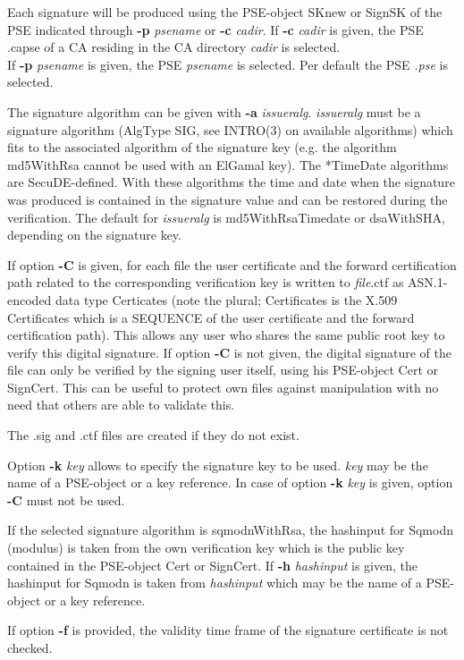 Each signature will be produced using the PSE-object SKnew or SignSK
of the PSE indicated through {\bf -p} {\em psename} or {\bf -c} {\em cadir}.
If {\bf -c} {\em cadir} is given, the PSE .capse of a CA residing in the CA directory {\em cadir}
is selected. \\
If {\bf -p} {\em psename} is given, the PSE {\em psename} is selected. Per default the PSE {\em .pse} is 
selected.

The signature algorithm can be given with {\bf -a} {\em issueralg}. 
{\em issueralg} must be a
signature algorithm (AlgType SIG, see INTRO(3) on available algorithms) which fits to the associated 
algorithm
of the signature key (e.g. the algorithm md5WithRsa cannot be used with an ElGamal key). The *TimeDate 
algorithms
are SecuDE-defined. With these algorithms the time and date when the signature was produced is 
contained
in the signature value and can be restored during the verification.
The default for {\em issueralg} is md5WithRsaTimedate or dsaWithSHA, depending on the signature key. 

If option {\bf -C} is given, for each file the user certificate and the forward certification path related to
the corresponding verification key is written to {\em file}.ctf as ASN.1-encoded data type Certicates 
(note the plural; Certificates is the X.509 Certificates which is a SEQUENCE of the user certificate and
the forward certification path). This allows any user who shares the same public root key to verify
this digital signature. If option {\bf -C} is not given, the digital signature of the file can only be
verified by the signing user itself, using his PSE-object Cert or SignCert. This can be useful to
protect own files against manipulation with no need that others are able to validate this.

The .sig and .ctf files are created if they do not exist.
 
Option {\bf -k} {\em key} allows to specify the signature key to be used. {\em key} may
be the name of a PSE-object or a key reference. In case of option {\bf -k} {\em key} is given,
option {\bf -C} must not be used.

If the selected signature algorithm is sqmodnWithRsa, the hashinput for Sqmodn (modulus) is taken 
from the own verification key which is the public key contained in the PSE-object Cert or SignCert.
If {\bf -h} {\em hashinput} is given, the hashinput for Sqmodn is taken from {\em hashinput}
which may be the name of a PSE-object or a key reference.

If option {\bf -f} is provided, the validity time frame of the signature certificate is not checked.

